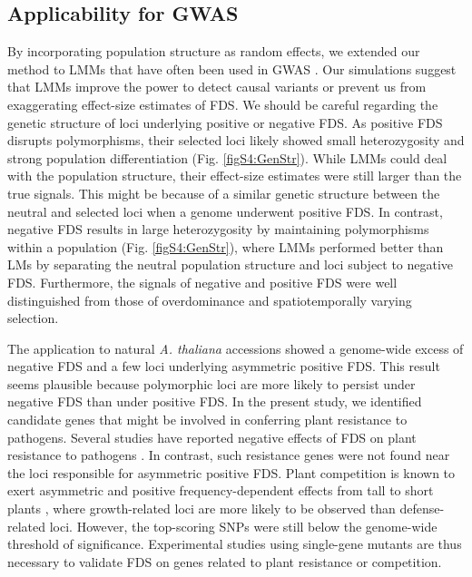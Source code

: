 \documentclass[12pt,]{article}
\begin{document}
\subsection{Applicability for GWAS}
By incorporating population structure as random effects, we extended our method to LMMs that have often been used in GWAS \citep{kang2008efficient}. Our simulations suggest that LMMs improve the power to detect causal variants or prevent us from exaggerating effect-size estimates of FDS. We should be careful regarding the genetic structure of loci underlying positive or negative FDS. As positive FDS disrupts polymorphisms, their selected loci likely showed small heterozygosity and strong population differentiation (Fig. \ref{figS4:GenStr}). While LMMs could deal with the population structure, their effect-size estimates were still larger than the true signals. This might be because of a similar genetic structure between the neutral and selected loci when a genome underwent positive FDS. In contrast, negative FDS results in large heterozygosity by maintaining polymorphisms within a population (Fig. \ref{figS4:GenStr}), where LMMs performed better than LMs by separating the neutral population structure and loci subject to negative FDS. Furthermore, the signals of negative and positive FDS were well distinguished from those of overdominance and spatiotemporally varying selection.

The application to natural \textit{A. thaliana} accessions showed a genome-wide excess of negative FDS and a few loci underlying asymmetric positive FDS. This result seems plausible because polymorphic loci are more likely to persist under negative FDS than under positive FDS. In the present study, we identified candidate genes that might be involved in conferring plant resistance to pathogens. Several studies have reported negative effects of FDS on plant resistance to pathogens \citep{antonovics1984experimental, brunet2000disease}. In contrast, such resistance genes were not found near the loci responsible for asymmetric positive FDS. Plant competition is known to exert asymmetric and positive frequency-dependent effects from tall to short plants \citep{weiner1990asymmetric}, where growth-related loci are more likely to be observed than defense-related loci. However, the top-scoring SNPs were still below the genome-wide threshold of significance. Experimental studies using single-gene mutants are thus necessary to validate FDS on genes related to plant resistance or competition.
\end{document}
